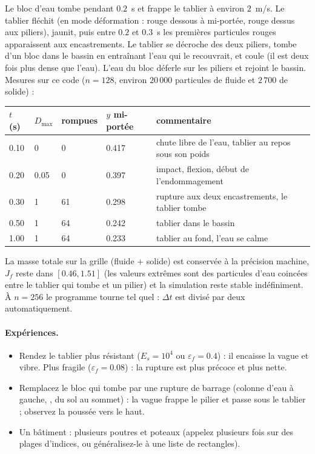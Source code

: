 \documentclass[11pt,a4paper]{article}
\newcommand{\code}[1]{\texttt{\detokenize{#1}}}
\begin{document}
Le bloc d'eau tombe pendant $0.2$~s et frappe le tablier à environ $2$~m/s. Le tablier fléchit
(en mode déformation : rouge dessous à mi-portée, rouge dessus aux piliers), jaunit, puis entre
$0.2$ et $0.3$~s les premières particules rouges apparaissent aux encastrements. Le tablier se
décroche des deux piliers, tombe d'un bloc dans le bassin en entraînant l'eau qui le recouvrait,
et coule (il est deux fois plus dense que l'eau). L'eau du bloc déferle sur les piliers et
rejoint le bassin. Mesures sur ce code ($n = 128$, environ $20\,000$ particules de fluide et
$2\,700$ de solide) :

\begin{center}
\begin{tabular}{@{}lllll@{}}
\toprule
$t$ (s) & $D_{\max}$ & rompues & $y$ mi-portée & commentaire \\
\midrule
0.10 & 0 & 0 & 0.417 & chute libre de l'eau, tablier au repos sous son poids \\
0.20 & 0.05 & 0 & 0.397 & impact, flexion, début de l'endommagement \\
0.30 & 1 & 61 & 0.298 & rupture aux deux encastrements, le tablier tombe \\
0.50 & 1 & 64 & 0.242 & tablier dans le bassin \\
1.00 & 1 & 64 & 0.233 & tablier au fond, l'eau se calme \\
\bottomrule
\end{tabular}
\end{center}

La masse totale sur la grille (fluide $+$ solide) est conservée à la précision machine, $J_f$
reste dans $[0.46, 1.51]$ (les valeurs extrêmes sont des particules d'eau coincées entre le
tablier qui tombe et un pilier) et la simulation reste stable indéfiniment. À $n = 256$ le
programme tourne tel quel : $\Delta t$ est divisé par deux automatiquement.

\paragraph{Expériences.}
\begin{itemize}
  \item Rendez le tablier plus résistant ($E_s = 10^4$ ou $\varepsilon_f = 0.4$) : il encaisse la
        vague et vibre. Plus fragile ($\varepsilon_f = 0.08$) : la rupture est plus précoce et plus nette.
  \item Remplacez le bloc qui tombe par une rupture de barrage (colonne d'eau à gauche,
        \code{water_x0, water_x1 = 0.03, 0.30}, du sol au sommet) : la vague frappe le pilier et
        passe sous le tablier ; observez la poussée vers le haut.
  \item Un bâtiment : plusieurs poutres et poteaux (appelez \code{init_beam} plusieurs fois sur des
        plages d'indices, ou généralisez-le à une liste de rectangles).
\end{itemize}
\end{document}
